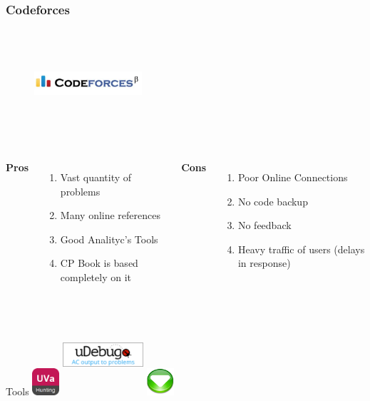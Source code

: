 \documentclass{beamer}
\begin{document}

\begin{frame}
	\frametitle{Codeforces}
	\begin{figure}[t]
		\href{http://codeforces.com/help}{\includegraphics[width=4cm,height=4cm,keepaspectratio]{images/judges/codeforces}}
	\end{figure}
	
	\begin{columns}[c] %
		\textbf{Pros}
		\begin{enumerate}
			\item Vast quantity of problems 
			\item Many online references 
			\item Good Analityc's Tools 
			\item CP Book is based completely on it
		\end{enumerate}
		\textbf{Cons}
		\begin{enumerate}
			\item Poor Online Connections
			\item No code backup
			\item No feedback
			\item Heavy traffic of users (delays in response)
		\end{enumerate}
	\end{columns}
	\begin{block}{Tools}
	\center
	\href{http://uhunt.felix-halim.net/} {\includegraphics[width=1cm,height=1cm,keepaspectratio]{images/tools/uvahunting}}
	\href{https://www.udebug.com/}	{\includegraphics[width=3cm,height=3cm,keepaspectratio]{images/tools/udebug}}
	\href{http://uvatoolkit.com/problemssolve.php}{\includegraphics[width=1cm,height=1cm,keepaspectratio]{images/tools/uvatoolkit}}
	\end{block}

\end{frame}
\end{document}
